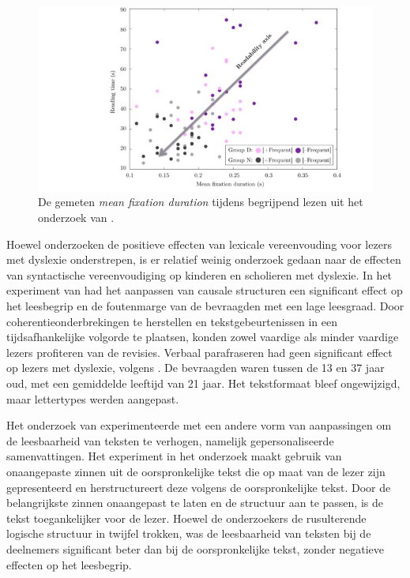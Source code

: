 \medspace

\begin{figure}
\includegraphics[width=\linewidth]{img/readability-mean-fixation-duration.png}
\caption{De gemeten \textit{mean fixation duration} tijdens begrijpend lezen uit het onderzoek van \textcite{Rello2013a}.}
\label{img:readability-mean-fixation-duration}
\end{figure}

\medspace

Hoewel onderzoeken de positieve effecten van lexicale vereenvouding voor lezers met dyslexie onderstrepen, is er relatief weinig onderzoek gedaan naar de effecten van syntactische vereenvoudiging op kinderen en scholieren met dyslexie. In het experiment van \textcite{Linderholm2000} had het aanpassen van causale structuren een significant effect op het leesbegrip en de foutenmarge van de bevraagden met een lage leesgraad. Door coherentieonderbrekingen te herstellen en tekstgebeurtenissen in een tijdsafhankelijke volgorde te plaatsen, konden zowel vaardige als minder vaardige lezers profiteren van de revisies. Verbaal parafraseren had geen significant effect op lezers met dyslexie, volgens \textcite{Rello2013c}. De bevraagden waren tussen de 13 en 37 jaar oud, met een gemiddelde leeftijd van 21 jaar. Het tekstformaat bleef ongewijzigd, maar lettertypes werden aangepast.

\medspace

Het onderzoek van \textcite{Nandhini2013} experimenteerde met een andere vorm van aanpassingen om de leesbaarheid van teksten te verhogen, namelijk gepersonaliseerde samenvattingen. Het experiment in het onderzoek maakt gebruik van onaangepaste zinnen uit de oorspronkelijke tekst die op maat van de lezer zijn gepresenteerd en herstructureert deze volgens de oorspronkelijke tekst. Door de belangrijkste zinnen onaangepast te laten en de structuur aan te passen, is de tekst toegankelijker voor de lezer. Hoewel de onderzoekers de rusulterende logische structuur in twijfel trokken, was de leesbaarheid van teksten bij de deelnemers significant beter dan bij de oorspronkelijke tekst, zonder negatieve effecten op het leesbegrip.

